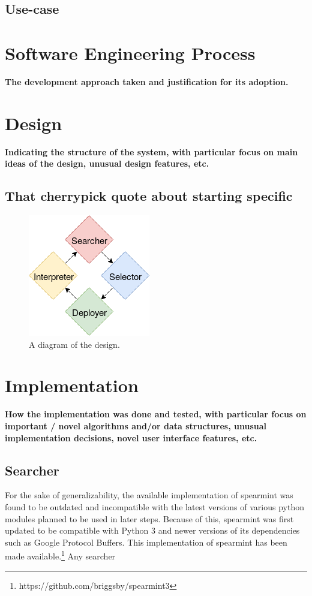 \documentclass{article}
\begin{document}
\subsection{Use-case}
\section{Software Engineering Process}
\textbf{The development approach taken and justification for its
adoption.}
\section{Design}
\textbf{Indicating the structure of the system, with particular
focus on main ideas of the design, unusual design
features, etc. \\}
\subsection{That cherrypick quote about starting specific}
\begin{figure}[!ht]
  \caption{A diagram of the design.}
  \centering
   \includegraphics[scale=0.8]{Design}
\end{figure}
\section{Implementation}
\textbf{How the implementation was done and tested, with
particular focus on important / novel algorithms and/or
data structures, unusual implementation decisions, novel
user interface features, etc.}
\subsection{Searcher}
For the sake of generalizability, the available implementation of spearmint was found to be outdated and incompatible with the latest versions of various python modules planned to be used in later steps. 
Because of this, spearmint was first updated to be compatible with Python 3 and newer versions of its dependencies such as Google Protocol Buffers. This implementation of spearmint has been made available.\footnote{https://github.com/briggsby/spearmint3}
Any searcher 
\end{document}
